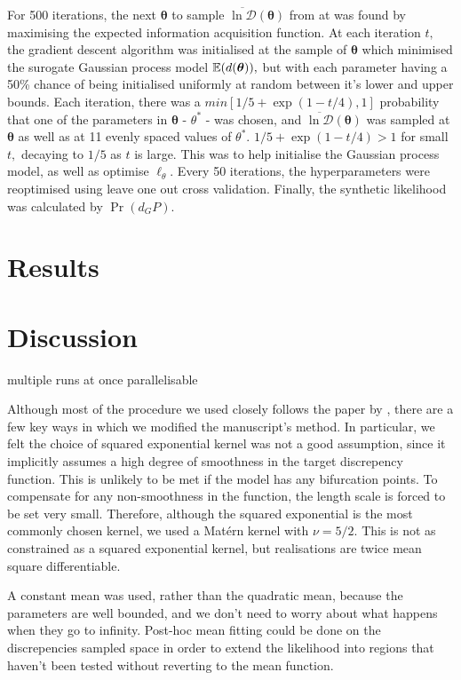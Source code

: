 For 500 iterations, the next $\bm{\theta}$ to sample 
$\overline{\ln\mathcal{D}}(\bm{\theta})$ from
at was found by maximising the expected information acquisition function. 
At each iteration $t,$ 
the gradient descent algorithm was initialised at the sample of $\bm{\theta}$
which minimised the surogate Gaussian process model $\operatorname{\mathbb{E}}(d(\bm{\theta})),$ but
with each parameter having a 50\% chance of being initialised uniformly at 
random between it's lower and upper bounds. Each iteration, there was a 
$min\left[1/5 + \exp(1 - t/4), 1 \right]$ probability that one of the
parameters in $\bm{\theta}$ -
$\theta^*$ -
was chosen, and $\overline{\ln\mathcal{D}}(\bm{\theta})$ was sampled at 
$\bm{\theta}$ as well as at 11 evenly spaced values of
$\theta^*.$ $1/5 + \exp(1 - t/4)>1$ for small $t,$ decaying to $1/5$ as $t$ is
large. This was to help initialise the Gaussian process model, as well as
optimise $\ell_\theta.$ Every 50 iterations, the hyperparameters were 
reoptimised using leave one out cross validation. Finally, the synthetic 
likelihood was calculated by $\Pr(d_GP).$

\chapter{Results}

\chapter{Discussion}

multiple runs at once parallelisable

Although most of the procedure we used closely follows the paper by
\cite{gutmann_bayesian_2016}, there are a few key ways in which we modified the
manuscript's method. In particular, we felt the choice of squared exponential
kernel was not a good assumption, since it implicitly assumes a high degree of
smoothness in the target discrepency function. This is unlikely to be met if
the model has any bifurcation points. To compensate for any non-smoothness in
the function, the length scale is forced to be set very small. Therefore,
although the squared exponential is the most commonly chosen kernel,
we used a Mat\'ern kernel with $\nu = 5/2$. This is not as constrained as a
squared exponential kernel, but realisations are twice mean square
differentiable.

A constant mean was used, rather than the quadratic mean, because the
parameters are well bounded, and we don't need to worry about what happens when
they go to infinity. Post-hoc mean fitting could be done on the discrepencies
sampled space in order to extend the likelihood into regions that haven't been
tested without reverting to the mean function.

